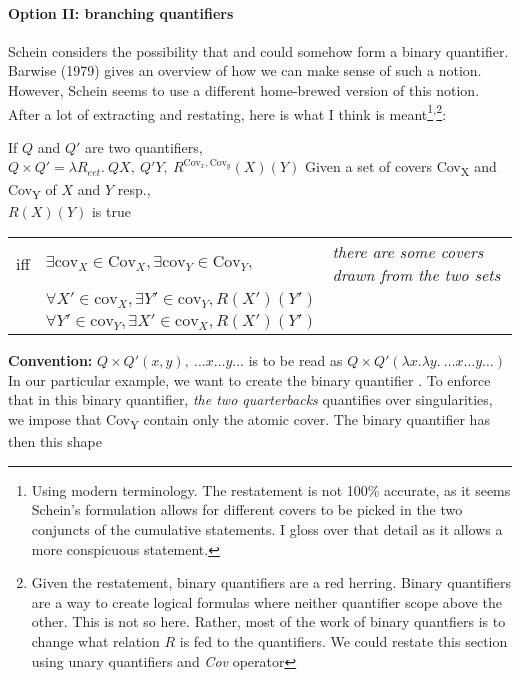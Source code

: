 \paragraph{Option II: branching quantifiers} Schein considers the possibility that  and  could somehow form a binary quantifier. Barwise (1979) gives an overview of how we can make sense of such a notion. However, Schein seems to use a different home-brewed version of this notion. After a lot of extracting and restating, here is what I think is meant\footnote{Using modern terminology. The restatement is not 100\% accurate, as it seems Schein's formulation allows for different covers to be picked in the two conjuncts of the cumulative statements. I gloss over that detail as it allows a more conspicuous statement.}\textsuperscript{,}\footnote{Given the restatement, binary quantifiers are a red herring. Binary quantifiers are a way to create logical formulas where neither quantifier scope above the other. This is not so here. Rather, most of the work of binary quantfiers is to change what relation $R$ is fed to the quantifiers. We could restate this section using unary quantifiers and \emph{Cov} operator}:

\pex
\a 
If $Q$ and $Q'$ are two quantifiers,\\
$Q\times Q' = \lambda R_{eet}.\  Q X,\ Q' Y,\
R^{\text{Cov}_x,\text{Cov}_y}(X)(Y)
$
\a Given a set of covers Cov\textsubscript{X} and Cov\textsubscript{Y} of $X$ and $Y$ resp., \\
$R(X)(Y)$ is true \\
\setlength{\tabcolsep}{3pt}
\begin{tabular}{lll}%
iff& $\exists \text{cov}_X\in \text{Cov}_{X}, \exists \text{cov}_Y\in \text{Cov}_{Y},$& \emph{there are some covers drawn from the two sets}\\
&$\forall X'\in \text{cov}_{X}, \exists Y'\in \text{cov}_{Y}, R(X')(Y')$&\\
&$\forall Y'\in \text{cov}_{Y}, \exists X'\in \text{cov}_{X}, R(X')(Y')$&\\

\end{tabular}
\a \textbf{Convention:} $Q\times Q' (x,y),\ \ldots x \ldots y \ldots$ is to be read as $Q\times Q'\left( \lambda x. \lambda y.\ \ldots x \ldots y \ldots\right) $ 
\xe
%
In our particular example, we want to create the binary quantifier . To enforce that in this binary quantifier, \emph{the two quarterbacks} quantifies over singularities, we impose that Cov\textsubscript{Y} contain only the atomic cover. The binary quantifier has then this shape

